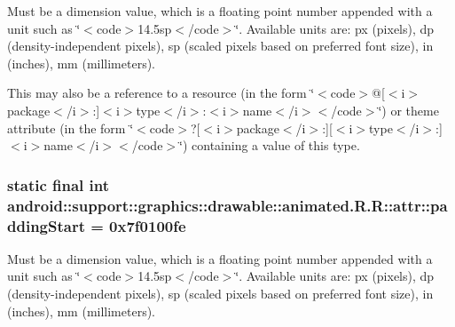 Must be a dimension value, which is a floating point number appended with a unit such as \char`\"{}$<$code$>$14.5sp$<$/code$>$\char`\"{}. Available units are: px (pixels), dp (density-independent pixels), sp (scaled pixels based on preferred font size), in (inches), mm (millimeters). 

This may also be a reference to a resource (in the form \char`\"{}$<$code$>$@\mbox{[}$<$i$>$package$<$/i$>$:\mbox{]}$<$i$>$type$<$/i$>$:$<$i$>$name$<$/i$>$$<$/code$>$\char`\"{}) or theme attribute (in the form \char`\"{}$<$code$>$?\mbox{[}$<$i$>$package$<$/i$>$:\mbox{]}\mbox{[}$<$i$>$type$<$/i$>$:\mbox{]}$<$i$>$name$<$/i$>$$<$/code$>$\char`\"{}) containing a value of this type. \hypertarget{classandroid_1_1support_1_1graphics_1_1drawable_1_1animated_1_1_r_1_1attr_a95707a9e48b1ed06bd41ee52003bee0}{
\subsubsection[{paddingStart}]{\setlength{\rightskip}{0pt plus 5cm}static final int android::support::graphics::drawable::animated.R.R::attr::paddingStart = 0x7f0100fe}}
\label{classandroid_1_1support_1_1graphics_1_1drawable_1_1animated_1_1_r_1_1attr_a95707a9e48b1ed06bd41ee52003bee0}


Must be a dimension value, which is a floating point number appended with a unit such as \char`\"{}$<$code$>$14.5sp$<$/code$>$\char`\"{}. Available units are: px (pixels), dp (density-independent pixels), sp (scaled pixels based on preferred font size), in (inches), mm (millimeters). 

